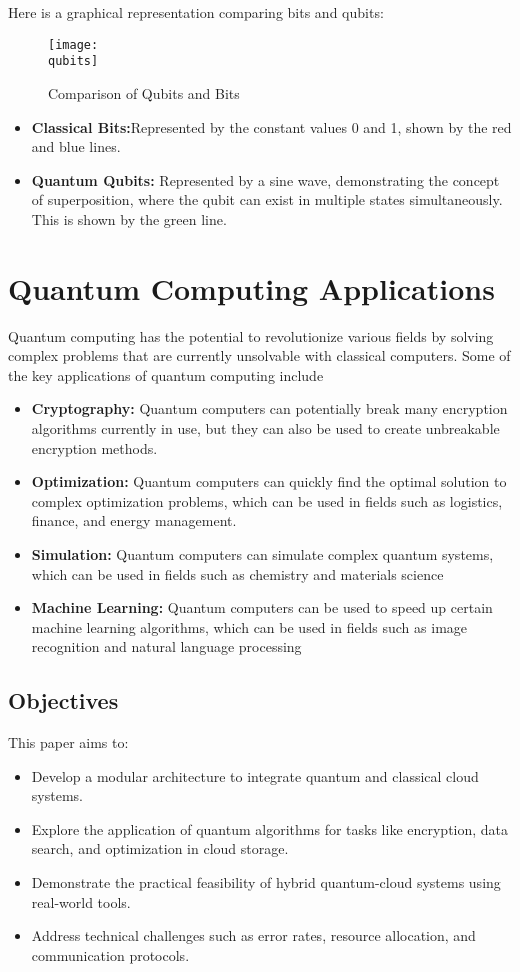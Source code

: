 \documentclass[12pt,a4paper]{article}
\newcommand{\qubits}{D:/SEM-5/FSDC/quantum-cloud-integration/images/qubits_vs_bits.png}
\begin{document}
Here is a graphical representation comparing bits and qubits:

\begin{figure}[h!]
    \centering
    \texttt{[image: \\qubits]}
    \caption{Comparison of Qubits and Bits}
    \label{fig:qubits_vs_bits}
\end{figure}

\begin{itemize}
    \item \textbf{Classical Bits:}Represented by the constant values 0 and 1, shown by the red and blue lines.
    \item \textbf{Quantum Qubits:} Represented by a sine wave, demonstrating the concept of superposition, where the qubit can exist in multiple states simultaneously. This is shown by the green line.
\end{itemize}
\newpage
\section{Quantum Computing Applications}
Quantum computing has the potential to revolutionize various fields by solving complex problems that are currently unsolvable
with classical computers. Some of the key applications of quantum computing include
\begin{itemize}
\item \textbf{Cryptography:} Quantum computers can potentially break many encryption algorithms currently in
use, but they can also be used to create unbreakable encryption methods.
\item \textbf{Optimization:} Quantum computers can quickly find the optimal solution to complex
optimization problems, which can be used in fields such as logistics, finance, and energy management.
\item \textbf{Simulation:} Quantum computers can simulate complex quantum systems, which can be used in
fields such as chemistry and materials science
\item \textbf{Machine Learning:} Quantum computers can be used to speed up certain machine 
learning algorithms, which can be used in fields such as image recognition and natural language processing

\end{itemize}


\subsection{Objectives}
This paper aims to:
\begin{itemize}
   \item Develop a modular architecture to integrate quantum and classical cloud systems.
   \item Explore the application of quantum algorithms for tasks like encryption, data search, and optimization in cloud storage.
   \item Demonstrate the practical feasibility of hybrid quantum-cloud systems using real-world tools.
   \item Address technical challenges such as error rates, resource allocation, and communication protocols.
\end{itemize}
\end{document}
